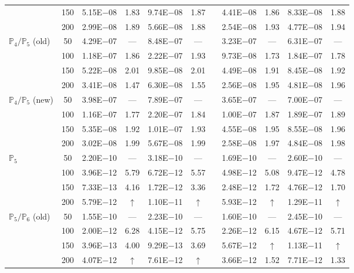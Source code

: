 \begin{table}[H]
{\begin{tabular}{@{}l c c c c c c c c c c@{}}
 & 150 & 5.15E$-$08 & 1.83  & 9.74E$-$08 & 1.87 &  & 4.41E$-$08 & 1.86 & 8.33E$-$08 & 1.88\\
 & 200 & 2.99E$-$08 & 1.89  & 5.66E$-$08 & 1.88 &  & 2.54E$-$08 & 1.93 & 4.77E$-$08 & 1.94\\
\midrule
\multirow{4}{*}{$\mathbb{P}_{4}/\mathbb{P}_{5}$ (old)}
 & 50 & 4.29E$-$07 & ---  & 8.48E$-$07 & --- &  & 3.23E$-$07 & --- & 6.31E$-$07 & ---\\
 & 100 & 1.18E$-$07 & 1.86  & 2.22E$-$07 & 1.93 &  & 9.73E$-$08 & 1.73 & 1.84E$-$07 & 1.78\\
 & 150 & 5.22E$-$08 & 2.01  & 9.85E$-$08 & 2.01 &  & 4.49E$-$08 & 1.91 & 8.45E$-$08 & 1.92\\
 & 200 & 3.41E$-$08 & 1.47  & 6.30E$-$08 & 1.55 &  & 2.56E$-$08 & 1.95 & 4.81E$-$08 & 1.96\\
\midrule
\multirow{4}{*}{$\mathbb{P}_{4}/\mathbb{P}_{5}$ (new)}
 & 50 & 3.98E$-$07 & ---  & 7.89E$-$07 & --- &  & 3.65E$-$07 & --- & 7.00E$-$07 & ---\\
 & 100 & 1.16E$-$07 & 1.77  & 2.20E$-$07 & 1.84 &  & 1.00E$-$07 & 1.87 & 1.89E$-$07 & 1.89\\
 & 150 & 5.35E$-$08 & 1.92  & 1.01E$-$07 & 1.93 &  & 4.55E$-$08 & 1.95 & 8.55E$-$08 & 1.96\\
 & 200 & 3.02E$-$08 & 1.99  & 5.67E$-$08 & 1.99 &  & 2.58E$-$08 & 1.97 & 4.84E$-$08 & 1.98\\
\midrule
\multirow{4}{*}{$\mathbb{P}_{5}$}
 & 50 & 2.20E$-$10 & ---  & 3.18E$-$10 & --- &  & 1.69E$-$10 & --- & 2.60E$-$10 & ---\\
 & 100 & 3.96E$-$12 & 5.79  & 6.72E$-$12 & 5.57 &  & 4.98E$-$12 & 5.08 & 9.47E$-$12 & 4.78\\
 & 150 & 7.33E$-$13 & 4.16  & 1.72E$-$12 & 3.36 &  & 2.48E$-$12 & 1.72 & 4.76E$-$12 & 1.70\\
 & 200 & 5.79E$-$12 & $\uparrow$  & 1.10E$-$11 & $\uparrow$ &  & 5.93E$-$12 & $\uparrow$ & 1.29E$-$11 & $\uparrow$\\
\midrule
\multirow{4}{*}{$\mathbb{P}_{5}/\mathbb{P}_{6}$ (old)}
 & 50 & 1.55E$-$10 & ---  & 2.23E$-$10 & --- &  & 1.60E$-$10 & --- & 2.45E$-$10 & ---\\
 & 100 & 2.00E$-$12 & 6.28  & 4.15E$-$12 & 5.75 &  & 2.26E$-$12 & 6.15 & 4.67E$-$12 & 5.71\\
 & 150 & 3.96E$-$13 & 4.00  & 9.29E$-$13 & 3.69 &  & 5.67E$-$12 & $\uparrow$ & 1.13E$-$11 & $\uparrow$\\
 & 200 & 4.07E$-$12 & $\uparrow$  & 7.61E$-$12 & $\uparrow$ &  & 3.66E$-$12 & 1.52 & 7.71E$-$12 & 1.33\\

\end{tabular}}
\end{table}
